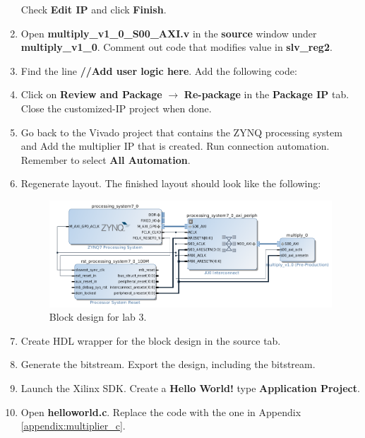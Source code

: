 \documentclass[11pt,letterpaper,titlepage]{article}
\begin{document}
\begin{enumerate}
    Check \textbf{Edit IP} and click \textbf{Finish}.
    
    \item Open \textbf{multiply\_v1\_0\_S00\_AXI.v} in the \textbf{source} window under \textbf{multiply\_v1\_0}. Comment out code that modifies value in \textbf{slv\_reg2}.
    
    \item Find the line \textbf{//Add user logic here}. Add the following code:
    
    
    
    \item Click on \textbf{Review and Package} $\rightarrow$ \textbf{Re-package} in the \textbf{Package IP} tab. Close the customized-IP project when done.
    
    \item Go back to the Vivado project that contains the ZYNQ processing system and Add the multiplier IP that is created. Run connection automation. Remember to select \textbf{All Automation}.
    
    \item Regenerate layout. The finished layout should look like the following:
    
    \begin{figure}[ht]
    \centering
    \includegraphics[width=\textwidth]{layout.png}
    \caption{Block design for lab 3.}
    \end{figure}
    
    \item Create HDL wrapper for the block design in the source tab.
    
    \item Generate the bitstream. Export the design, including the bitstream.
    
    \item Launch the Xilinx SDK. Create a \textbf{Hello World!} type \textbf{Application Project}.
    
    \item Open \textbf{helloworld.c}. Replace the code with the one in Appendix \ref{appendix:multiplier_c}.
    

\end{enumerate}
\end{document}
